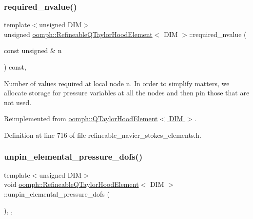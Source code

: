 \subsubsection{\texorpdfstring{required\+\_\+nvalue()}{required\_nvalue()}}
{\footnotesize\ttfamily template$<$unsigned D\+IM$>$ \\
unsigned \hyperlink{classoomph_1_1RefineableQTaylorHoodElement}{oomph\+::\+Refineable\+Q\+Taylor\+Hood\+Element}$<$ D\+IM $>$\+::required\+\_\+nvalue (\begin{DoxyParamCaption}\item[{const unsigned \&}]{n }\end{DoxyParamCaption}) const\hspace{0.3cm}{\ttfamily [inline]}, {\ttfamily [virtual]}}



Number of values required at local node n. In order to simplify matters, we allocate storage for pressure variables at all the nodes and then pin those that are not used. 



Reimplemented from \hyperlink{classoomph_1_1QTaylorHoodElement_a7993924abd5095ebaa776ee0e080e600}{oomph\+::\+Q\+Taylor\+Hood\+Element$<$ D\+I\+M $>$}.



Definition at line 716 of file refineable\+\_\+navier\+\_\+stokes\+\_\+elements.\+h.

\mbox{\label{classoomph_1_1RefineableQTaylorHoodElement_a130b113b3de095ab4f17e18f3659c84a}} 
\subsubsection{\texorpdfstring{unpin\+\_\+elemental\+\_\+pressure\+\_\+dofs()}{unpin\_elemental\_pressure\_dofs()}}
{\footnotesize\ttfamily template$<$unsigned D\+IM$>$ \\
void \hyperlink{classoomph_1_1RefineableQTaylorHoodElement}{oomph\+::\+Refineable\+Q\+Taylor\+Hood\+Element}$<$ D\+IM $>$\+::unpin\+\_\+elemental\+\_\+pressure\+\_\+dofs (\begin{DoxyParamCaption}{ }\end{DoxyParamCaption})\hspace{0.3cm}{\ttfamily [inline]}, {\ttfamily [private]}, {\ttfamily [virtual]}}



